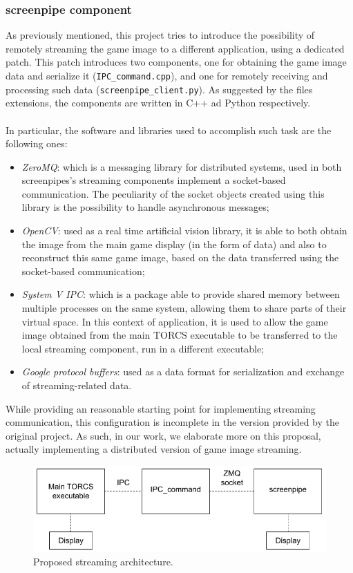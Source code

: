 \subsubsection{screenpipe component}
As previously mentioned, this project tries to introduce the possibility of remotely streaming the game image to a different application, using a dedicated patch. This patch introduces two components, one for obtaining the game image data and serialize it (\texttt{IPC\_command.cpp}), and one for remotely receiving and processing such data (\texttt{screenpipe\_client.py}). As suggested by the files extensions, the components are written in C++ ad Python respectively. \\ \\
In particular, the software and libraries used to accomplish such task are the following ones:
\begin{itemize}
	\item \textit{ZeroMQ}: which is a messaging library for distributed systems, used in both screenpipes's streaming components implement a socket-based communication. The peculiarity of the socket objects created using this library is the possibility to handle asynchronous messages;
	\item \textit{OpenCV}: used as a real time artificial vision library, it is able to both obtain the image from the main game display (in the form of data) and also to reconstruct this same game image, based on the data transferred using the socket-based communication;
	\item \textit{System V IPC}: which is a package able to provide shared memory between multiple processes on the same system, allowing them to share parts of their virtual space. In this context of application, it is used to allow the game image obtained from the main TORCS executable to be transferred to the local streaming component, run in a different executable;
	\item \textit{Google protocol buffers}: used as a data format for serialization and exchange of streaming-related data.
\end{itemize}
While providing an reasonable starting point for implementing streaming communication, this configuration is incomplete in the version provided by the original project. As such, in our work, we elaborate more on this proposal, actually implementing a distributed version of game image streaming.

\begin{figure}
	\centering
	\includegraphics[width=0.8\linewidth]{"immagini/Software development/patched-torcs-architecture"}
	\caption[Proposed streaming architecture]{Proposed streaming architecture.}
	\label{fig:patched-torcs-architecture}
\end{figure}



